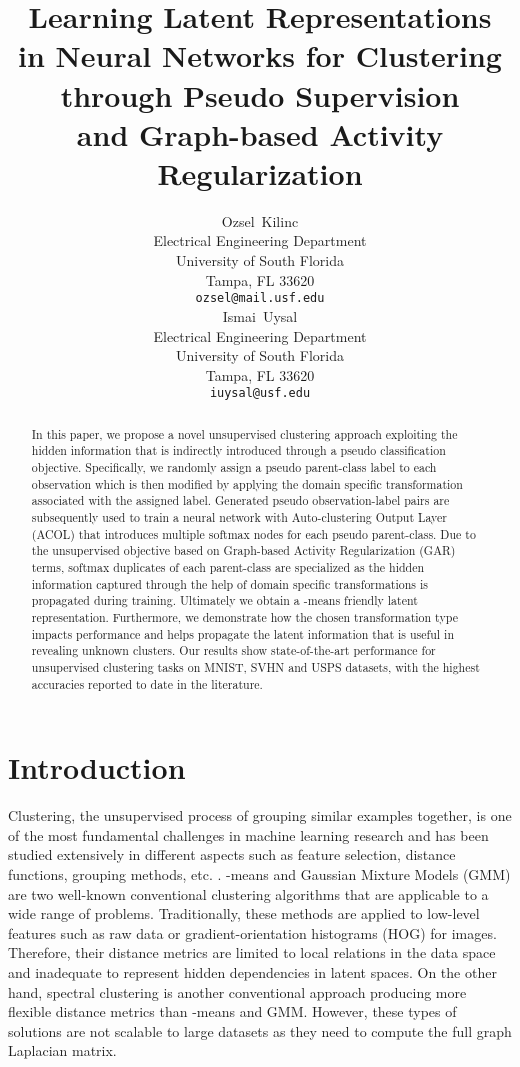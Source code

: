 \documentclass{article} \usepackage{iclr2018_conference,times}
\title{Learning Latent Representations \\in Neural Networks for Clustering \\through Pseudo Supervision \\and Graph-based Activity Regularization}
\author{
  Ozsel~Kilinc \\
  Electrical Engineering Department\\
  University of South Florida\\
  Tampa, FL 33620 \\
  \texttt{ozsel@mail.usf.edu} \\
\And
  Ismai~Uysal  \\
  Electrical Engineering Department \\
  University of South Florida \\
  Tampa, FL 33620  \\
  \texttt{iuysal@usf.edu} \\
}
\begin{document}
\maketitle

\begin{abstract}
	
In this paper, we propose a novel unsupervised clustering approach exploiting the hidden information that is indirectly introduced through a pseudo classification objective. Specifically, we randomly assign a pseudo parent-class label to each observation which is then modified by applying the domain specific transformation associated with the assigned label. Generated pseudo observation-label pairs are subsequently used to train a neural network with Auto-clustering Output Layer (ACOL) that introduces multiple softmax nodes for each pseudo parent-class. Due to the unsupervised objective based on Graph-based Activity Regularization (GAR) terms, softmax duplicates of each parent-class are specialized as the hidden information captured through the help of domain specific transformations is propagated during training. Ultimately we obtain a -means friendly latent representation. Furthermore, we demonstrate how the chosen transformation type impacts performance and helps propagate the latent information that is useful in revealing unknown clusters. Our results show state-of-the-art performance for unsupervised clustering tasks on MNIST, SVHN and USPS datasets, with the highest accuracies reported to date in the literature.
\end{abstract}

\section{Introduction}

Clustering, the unsupervised process of grouping similar examples together, is one of the most fundamental challenges in machine learning research and has been studied extensively in different aspects such as feature selection, distance functions, grouping methods, etc. \citep{aggarwal2013}. -means \citep{macqueen1967some} and Gaussian Mixture Models (GMM) \citep{Bishop07} are two well-known conventional clustering algorithms that are applicable to a wide range of problems. Traditionally, these methods are applied to low-level features such as raw data or gradient-orientation histograms (HOG) for images. Therefore, their distance metrics are limited to local relations in the data space and inadequate to represent hidden dependencies in latent spaces. On the other hand, spectral clustering \citep{Luxburg07} is another conventional approach producing more flexible distance metrics than -means and GMM. However, these types of solutions are not scalable to large datasets as they need to compute the full graph Laplacian matrix.
\end{document}
